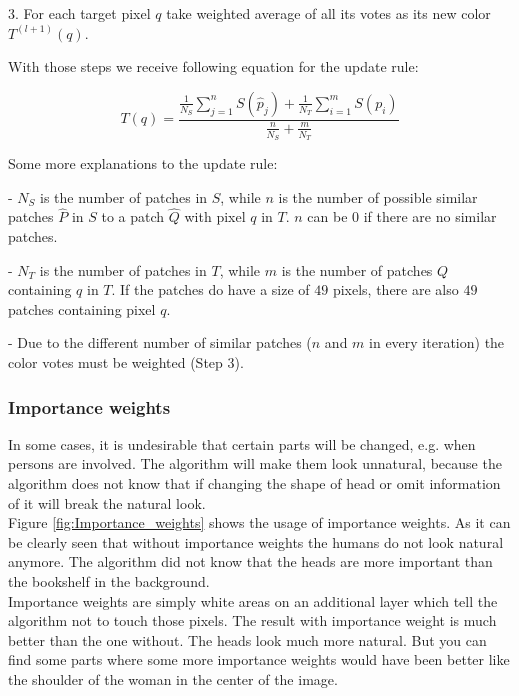 \vspace{15px}
3. For each target pixel $q$ take weighted average of all its votes as its new color $T^{(l+1)}(q)$.

\vspace{15px}
With those steps we receive following equation for the update rule:

\large
\begin{equation}
\label{Eq:Update rule}
T(q)=\frac{\frac{1}{N_{S}} \sum_{j=1}^{n} S(\hat{p}_{j}) + \frac{1}{N_{T}} \sum_{i=1}^{m} S(p_{i})}{\frac{n}{N_{S}} + \frac{m}{N_{T}}}
\end{equation}
\normalsize

\vspace{15px}
Some more explanations to the update rule:

\vspace{7px}
- $N_{S}$ is the number of patches in $S$, while $n$ is the number of possible similar patches $\hat{P}$ in $S$ to a patch $\hat{Q}$ with pixel $q$ in $T$. $n$ can be $0$ if there are no similar patches.

\vspace{7px}
- $N_{T}$ is the number of patches in $T$, while $m$ is the number of patches $Q$ containing $q$ in $T$. If the patches do have a size of $49$ pixels, there are also $49$ patches containing pixel $q$. 

\vspace{7px}
- Due to the different number of similar patches ($n$ and $m$ in every iteration) the color votes must be weighted (Step 3).



\subsubsection{Importance weights}
In some cases, it is undesirable that certain parts will be changed, e.g. when persons are involved. The algorithm will make them look unnatural, because the algorithm does not know that if changing the shape of head or omit information of it will break the natural look.\\
Figure \ref{fig:Importance_weights} shows the usage of importance weights. As it can be clearly seen that without importance weights the humans do not look natural anymore. The algorithm did not know that the heads are more important than the bookshelf in the background.\\
Importance weights are simply white areas on an additional layer which tell the algorithm not to touch those pixels. The result with importance weight is much better than the one without. The heads look much more natural. But you can find some parts where some more importance weights would have been better like the shoulder of the woman in the center of the image.

